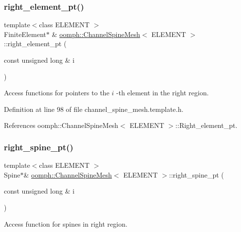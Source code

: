 \subsubsection{\texorpdfstring{right\+\_\+element\+\_\+pt()}{right\_element\_pt()}}
{\footnotesize\ttfamily template$<$class E\+L\+E\+M\+E\+NT $>$ \\
Finite\+Element$\ast$ \& \hyperlink{classoomph_1_1ChannelSpineMesh}{oomph\+::\+Channel\+Spine\+Mesh}$<$ E\+L\+E\+M\+E\+NT $>$\+::right\+\_\+element\+\_\+pt (\begin{DoxyParamCaption}\item[{const unsigned long \&}]{i }\end{DoxyParamCaption})\hspace{0.3cm}{\ttfamily [inline]}}



Access functions for pointers to the $ i $ -\/th element in the right region. 



Definition at line 98 of file channel\+\_\+spine\+\_\+mesh.\+template.\+h.



References oomph\+::\+Channel\+Spine\+Mesh$<$ E\+L\+E\+M\+E\+N\+T $>$\+::\+Right\+\_\+element\+\_\+pt.

\mbox{\label{classoomph_1_1ChannelSpineMesh_a78a52a2e61a76bff0fa74b3fd2583092}} 
\subsubsection{\texorpdfstring{right\+\_\+spine\+\_\+pt()}{right\_spine\_pt()}}
{\footnotesize\ttfamily template$<$class E\+L\+E\+M\+E\+NT $>$ \\
Spine$\ast$\& \hyperlink{classoomph_1_1ChannelSpineMesh}{oomph\+::\+Channel\+Spine\+Mesh}$<$ E\+L\+E\+M\+E\+NT $>$\+::right\+\_\+spine\+\_\+pt (\begin{DoxyParamCaption}\item[{const unsigned long \&}]{i }\end{DoxyParamCaption})\hspace{0.3cm}{\ttfamily [inline]}}



Access function for spines in right region. 



